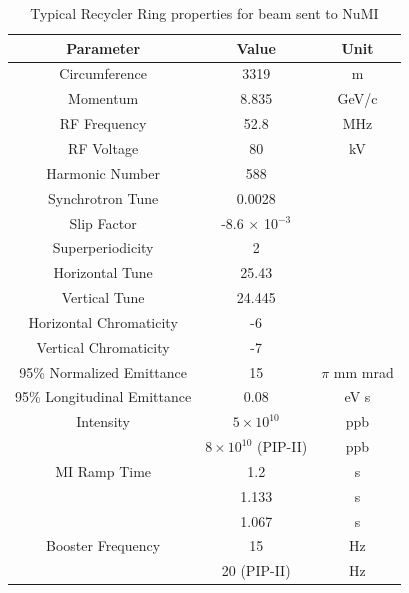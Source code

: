 \begin{table}[H]
\centering
\caption{Typical Recycler Ring properties for beam sent to NuMI}
\label{tab:rrparams}
\begin{tabular}{@{}ccc@{}}
\toprule
\textbf{Parameter}          & \textbf{Value}                             & \textbf{Unit} \\ \midrule
Circumference               & 3319                                       & m             \\
Momentum                    & 8.835                                      & GeV/c         \\
RF Frequency                & 52.8                                       & MHz           \\
RF Voltage                  & 80                                         & kV            \\
Harmonic Number             & 588                                        &               \\
Synchrotron Tune            & 0.0028                                     &               \\
Slip Factor                 & -8.6 $\times$ 10$^{-3}$                    &               \\
Superperiodicity            & 2                                          &               \\
Horizontal Tune             & 25.43                                      &               \\
Vertical Tune               & 24.445                                     &               \\
Horizontal Chromaticity     & -6                                         &               \\
Vertical Chromaticity       & -7                                         &               \\
95\% Normalized Emittance   & 15                                         & $\pi$ mm mrad \\
95\% Longitudinal Emittance & 0.08                                       & eV s          \\
Intensity                   & $5\times10^{10}$                           & ppb           \\
                            & $8\times10^{10}$ (PIP-II)                  & ppb           \\
MI Ramp Time                & 1.2                                        & s             \\
                            & 1.133                                      & s             \\
                            & 1.067                                      & s             \\
Booster Frequency           & 15                                         & Hz            \\
                            & 20 (PIP-II)                                & Hz            \\ \bottomrule
\end{tabular}
\end{table}


